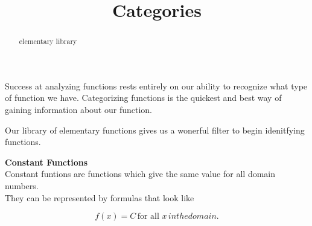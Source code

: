 \documentclass{ximera}
\title{Categories}
\begin{document}
\begin{abstract}
elementary library
\end{abstract}
\maketitle




Success at analyzing functions rests entirely on our ability to recognize what type of function we have.  Categorizing functions is the quickest and best way of gaining information about our function.

Our library of elementary functions gives us a wonerful filter to begin idenitfying functions.  \\



\begin{template}  \textbf{\textcolor{blue!55!black}{Constant Functions}} \\



Constant funtions are functions which give the same value for all domain numbers. \\


They can be represented by formulas that look like


\[ f(x) = C  \,  \text{for all } x  \, in the domain.   \]



\end{template}
\end{document}
